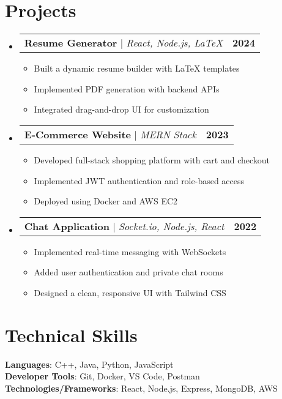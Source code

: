 \documentclass[letterpaper,11pt]{article}
\makeatletter
\newcommand{\resumeItem}[1]{\item\small{#1 \vspace{-2pt}}}
\newcommand{\resumeProjectHeading}[2]{
  \item
    \begin{tabular*}{1.001\textwidth}{l@{\extracolsep{\fill}}r}
      \small#1 & \textbf{\small #2}\\
    \end{tabular*}\vspace{-7pt}
}
\newcommand{\resumeSubHeadingListStart}{\begin{itemize}[leftmargin=0.0in, label={}]}
\newcommand{\resumeSubHeadingListEnd}{\end{itemize}}
\newcommand{\resumeItemListStart}{\begin{itemize}}
\newcommand{\resumeItemListEnd}{\end{itemize}\vspace{-5pt}}
\makeatother
\begin{document}
\section{Projects}
\vspace{-5pt}
\resumeSubHeadingListStart
  \resumeProjectHeading
    {\textbf{ Resume Generator } $|$ \emph{ React, Node.js, LaTeX }}{ 2024 }
    \resumeItemListStart
      \resumeItem{ Built a dynamic resume builder with LaTeX templates }
      \resumeItem{ Implemented PDF generation with backend APIs }
      \resumeItem{ Integrated drag-and-drop UI for customization }
    \resumeItemListEnd
    \vspace{-13pt}

  \resumeProjectHeading
    {\textbf{ E-Commerce Website } $|$ \emph{ MERN Stack }}{ 2023 }
    \resumeItemListStart
      \resumeItem{ Developed full-stack shopping platform with cart and checkout }
      \resumeItem{ Implemented JWT authentication and role-based access }
      \resumeItem{ Deployed using Docker and AWS EC2 }
    \resumeItemListEnd
    \vspace{-13pt}

  \resumeProjectHeading
    {\textbf{ Chat Application } $|$ \emph{ Socket.io, Node.js, React }}{ 2022 }
    \resumeItemListStart
      \resumeItem{ Implemented real-time messaging with WebSockets }
      \resumeItem{ Added user authentication and private chat rooms }
      \resumeItem{ Designed a clean, responsive UI with Tailwind CSS }
    \resumeItemListEnd
\resumeSubHeadingListEnd
\vspace{-15pt}

\section{Technical Skills}
\begin{itemize}[leftmargin=0.15in, label={}]
  \small{\item{
    \textbf{Languages}{: C++, Java, Python, JavaScript } \\
    \textbf{Developer Tools}{: Git, Docker, VS Code, Postman } \\
    \textbf{Technologies/Frameworks}{: React, Node.js, Express, MongoDB, AWS } \\
  }}
\end{itemize}
\vspace{-16pt}
\end{document}
